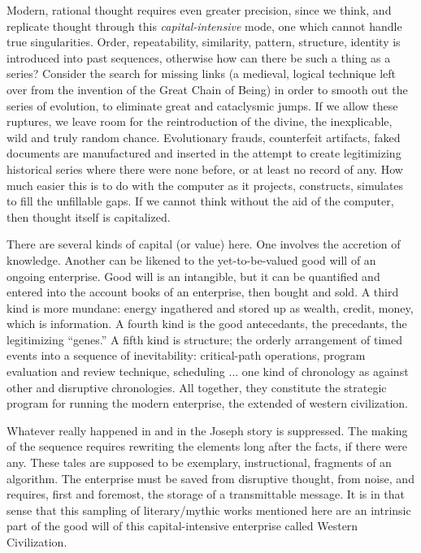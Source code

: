 \documentclass[11pt,twoside,draft]{memoir}
\begin{document}
Modern, rational thought requires even
greater precision, since we think, and replicate thought through this \emph{capital-intensive}
mode, one which cannot handle true singularities. Order, repeatability, similarity, pattern, structure,
identity is introduced into past sequences, otherwise how can there be
such a thing as a series? Consider the search
for missing links (a medieval, logical technique left over from the invention of the
Great Chain of Being) in order to smooth out
the series of evolution, to eliminate great and
cataclysmic jumps. If we allow these ruptures, we leave room for the reintroduction
of the divine, the inexplicable, wild and truly random chance. Evolutionary frauds,
counterfeit artifacts, faked documents are
manufactured and inserted in the attempt to
create legitimizing historical series where
there were none before, or at least no record
of any. How much easier this is to do with
the computer as it projects, constructs, simulates to fill the unfillable gaps. If we cannot
think without the aid of the computer, then
thought itself is capitalized.

There are several kinds of capital (or value) here. One involves the accretion of
knowledge. Another can be likened to the
yet-to-be-valued good will of an ongoing
enterprise. Good will is an intangible, but it
can be quantified and entered into the account books of an enterprise, then bought
and sold. A third kind is more mundane:
energy ingathered and stored up as wealth,
credit, money, which is information. A
fourth kind is the good antecedants,
the precedants, the legitimizing \enquote{genes.} A fifth
kind is structure; the orderly arrangement of
timed events into a sequence of inevitability:
critical-path operations, program evaluation
and review technique, scheduling ... one
kind of chronology as against other and
disruptive chronologies. All together, they
constitute the strategic program for running
the modern enterprise, the extended 
of western civilization.

Whatever really happened in  and
in the Joseph story is suppressed. The making of the sequence requires rewriting the
elements long after the facts, if there were
any. These tales are supposed to be exemplary, instructional, fragments of an algorithm. The enterprise must be saved from
disruptive thought, from noise, and requires,
first and foremost,
the storage of a transmittable message. It is in that sense that this
sampling of literary\slash mythic works mentioned
here are an intrinsic part of the good will of
this capital-intensive enterprise called Western Civilization.
\end{document}

